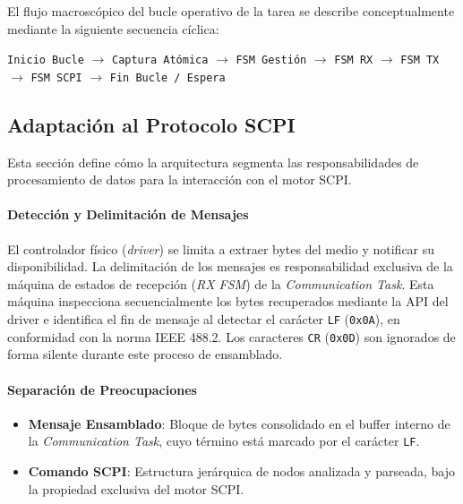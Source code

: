 El flujo macroscópico del bucle operativo de la tarea se describe conceptualmente mediante la siguiente secuencia cíclica:

\begin{center}
\small
\texttt{Inicio Bucle} $\rightarrow$ \texttt{Captura Atómica} $\rightarrow$ \texttt{FSM Gestión} $\rightarrow$ \texttt{FSM RX} $\rightarrow$ \texttt{FSM TX} $\rightarrow$ \texttt{FSM SCPI} $\rightarrow$ \texttt{Fin Bucle / Espera}
\end{center}

\subsection{Adaptación al Protocolo SCPI}
\label{subsec:scpi-adaptacion}

Esta sección define cómo la arquitectura segmenta las responsabilidades de procesamiento de datos para la interacción con el motor SCPI.

\paragraph{Detección y Delimitación de Mensajes}

El controlador físico (\textit{driver}) se limita a extraer bytes del medio y notificar su disponibilidad. La delimitación de los mensajes es responsabilidad exclusiva de la máquina de estados de recepción (\textit{RX FSM}) de la \textit{Communication Task}. Esta máquina inspecciona secuencialmente los bytes recuperados mediante la API del driver e identifica el fin de mensaje al detectar el carácter \texttt{LF} (\texttt{0x0A}), en conformidad con la norma IEEE 488.2. Los caracteres \texttt{CR} (\texttt{0x0D}) son ignorados de forma silente durante este proceso de ensamblado.

\paragraph{Separación de Preocupaciones}

\begin{itemize}
    \item \textbf{Mensaje Ensamblado}: Bloque de bytes consolidado en el buffer interno de la \textit{Communication Task}, cuyo término está marcado por el carácter \texttt{LF}.
    \item \textbf{Comando SCPI}: Estructura jerárquica de nodos analizada y parseada, bajo la propiedad exclusiva del motor SCPI.
\end{itemize}

